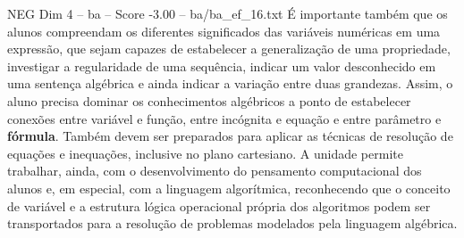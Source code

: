 \begin{textsample}{NEG Dim 4 – ba – Score -3.00 – ba/ba\_ef\_16.txt}
É importante também que os alunos compreendam os diferentes significados das variáveis numéricas em uma expressão, que sejam capazes de estabelecer a generalização de uma propriedade, investigar a regularidade de uma sequência, indicar um valor desconhecido em uma sentença algébrica e ainda indicar a variação entre duas grandezas.
Assim, o aluno precisa dominar os conhecimentos algébricos a ponto de estabelecer conexões entre variável e função, entre incógnita e equação e entre parâmetro e \textbf{fórmula}.
Também devem ser preparados para aplicar as técnicas de resolução de equações e inequações, inclusive no plano cartesiano.
A unidade permite trabalhar, ainda, com o desenvolvimento do pensamento computacional dos alunos e, em especial, com a linguagem algorítmica, reconhecendo que o conceito de variável e a estrutura lógica operacional própria dos algoritmos podem ser transportados para a resolução de problemas modelados pela linguagem algébrica.

\end{textsample}
